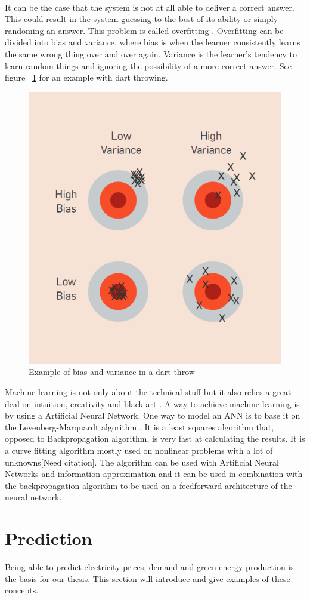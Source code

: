 \documentclass[twoside,11pt,openright]{report}
\begin{document}
\\[0.5cm]
It can be the case that the system is not at all able to deliver a correct answer. This could result in the system guessing to the best of its ability or simply randoming an answer. This problem is called overfitting \cite{18}. Overfitting can be divided into bias and variance, where bias is when the learner consistently learns the same wrong thing over and over again. Variance is the learner's tendency to learn random things and ignoring the possibility of a more correct answer. See figure ~\ref{fig:biasandvariance} for an example with dart throwing.
\begin{figure}[h!]
\centering
\includegraphics[width=0.5\linewidth,natwidth=898,natheight=587]{billeder/biasVSvariance.png}
\caption{Example of bias and variance in a dart throw \cite{18}}
\label{fig:biasandvariance}
\end{figure}

Machine learning is not only about the technical stuff but it also relies a great deal on intuition, creativity and  black art \cite{18}. 
\newline A way to achieve machine learning is by using a Artificial Neural Network. One way to model an ANN is to base it on the
Levenberg-Marquardt algorithm \cite{7,9,10}. It is a least squares algorithm that,
opposed to Backpropagation algorithm\cite{8}, is very fast at calculating the
results. It is a curve fitting algorithm mostly used on nonlinear problems with
a lot of unknowns[Need citation]. The algorithm can be used with Artificial Neural Networks and information approximation\cite{8} and it can be used in combination with the backpropagation algorithm to be used on a feedforward architecture of the neural network\cite{13}.
\section{Prediction}
Being able to predict electricity prices, demand and green energy production is the basis for our thesis. This section will introduce and give examples of these concepts. 
\end{document}
